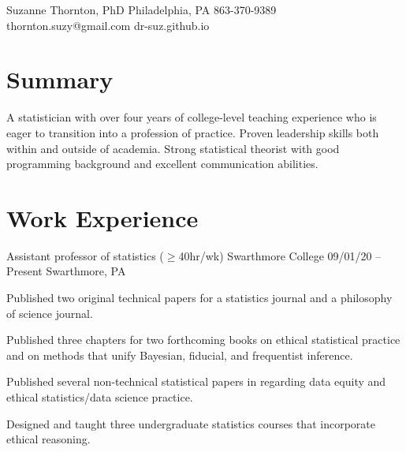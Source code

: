 \documentclass[letterpaper]{resume_config}
\begin{document}
\Header
    {Suzanne Thornton, PhD} %
    {Philadelphia, PA} %
    {863-370-9389} %
    {thornton.suzy@gmail.com} %
    {dr-suz.github.io} %

\section{Summary}
A statistician with over four years of college-level teaching experience who is eager to transition into a profession of practice. Proven leadership skills both within and outside of academia. Strong statistical theorist with good programming background and excellent communication abilities. 


\section{Work Experience}
\WorkExperience
    {Assistant professor of statistics {\small ($\geq$40hr/wk)}} %
    {Swarthmore College} %
    {09/01/20 -- Present} %
    {Swarthmore, PA} %
    {
        \item Published two original technical papers for a statistics journal and a philosophy of science journal. 
        \item Published three chapters for two forthcoming books on ethical statistical practice and on methods that unify Bayesian, fiducial, and frequentist inference. 
        \item Published several non-technical statistical papers in regarding data equity and ethical statistics/data science practice. 
        \item Designed and taught three undergraduate statistics courses that incorporate ethical reasoning. 
    } 
\end{document}
